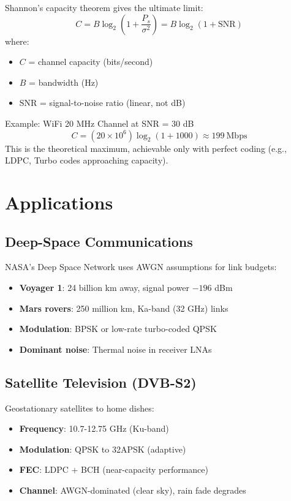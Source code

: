 Shannon's capacity theorem gives the ultimate limit:
\begin{equation}
C = B\log_2\left(1 + \frac{P_s}{\sigma^2}\right) = B\log_2(1 + \mathrm{SNR})
\end{equation}
where:
\begin{itemize}
\item $C$ = channel capacity (bits/second)
\item $B$ = bandwidth (Hz)
\item $\mathrm{SNR}$ = signal-to-noise ratio (linear, not dB)
\end{itemize}

\begin{calloutbox}{Example: WiFi 20 MHz Channel at SNR = 30 dB}
\begin{equation}
C = (20 \times 10^6)\log_2(1 + 1000) \approx 199\ \text{Mbps}
\end{equation}
This is the theoretical maximum, achievable only with perfect coding (e.g., LDPC, Turbo codes approaching capacity).
\end{calloutbox}

\section{Applications}

\subsection{Deep-Space Communications}

NASA's Deep Space Network uses AWGN assumptions for link budgets:
\begin{itemize}
\item \textbf{Voyager 1}: 24 billion km away, signal power $-196$ dBm
\item \textbf{Mars rovers}: 250 million km, Ka-band (32 GHz) links
\item \textbf{Modulation}: BPSK or low-rate turbo-coded QPSK
\item \textbf{Dominant noise}: Thermal noise in receiver LNAs
\end{itemize}

\subsection{Satellite Television (DVB-S2)}

Geostationary satellites to home dishes:
\begin{itemize}
\item \textbf{Frequency}: 10.7-12.75 GHz (Ku-band)
\item \textbf{Modulation}: QPSK to 32APSK (adaptive)
\item \textbf{FEC}: LDPC + BCH (near-capacity performance)
\item \textbf{Channel}: AWGN-dominated (clear sky), rain fade degrades
\end{itemize}

